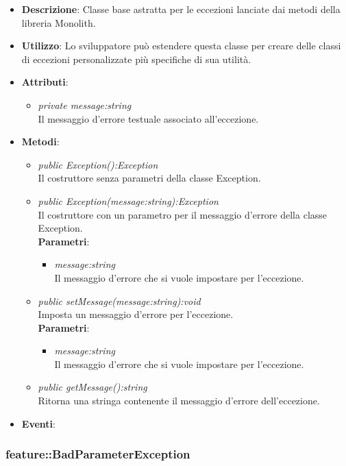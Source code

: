 \begin{itemize}
\item \textbf{Descrizione}: Classe base astratta per le eccezioni lanciate dai metodi della libreria Monolith.
\item \textbf{Utilizzo}: Lo sviluppatore può estendere questa classe per creare delle classi di eccezioni personalizzate più specifiche di sua utilità.
\item \textbf{Attributi}: 
	\begin{itemize}
	\item \textit{private message:string}\\
	Il messaggio d'errore testuale associato all'eccezione.
	\end{itemize}
\item \textbf{Metodi}:
	\begin{itemize}
	\item \textit{public Exception():Exception}\\
	Il costruttore senza parametri della classe Exception.
	\item \textit{public Exception(message:string):Exception}\\
	Il costruttore con un parametro per il messaggio d'errore della classe Exception.
			\\ \textbf{Parametri}: \begin{itemize}
			\item \textit{message:string}\\
			Il messaggio d'errore che si vuole impostare per l'eccezione.
			\end{itemize} 
	\item \textit{public setMessage(message:string):void}\\
	Imposta un messaggio d'errore per l'eccezione.
			\\ \textbf{Parametri}: \begin{itemize}
			\item \textit{message:string}\\
			Il messaggio d'errore che si vuole impostare per l'eccezione.
			\end{itemize} 
	\item \textit{public getMessage():string}\\
	Ritorna una stringa contenente il messaggio d'errore dell'eccezione.
	\end{itemize}
\item \textbf{Eventi}:
\end{itemize}

\subsubsection{feature::BadParameterException}


